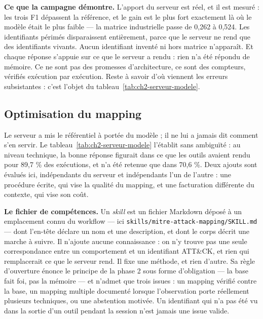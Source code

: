 \textbf{Ce que la campagne démontre.} L'apport du serveur est réel, et il est mesuré : les trois F1 dépassent la référence, et le gain est le plus fort exactement là où le modèle était le plus faible --- la matrice industrielle passe de 0,262 à 0,524. Les identifiants périmés disparaissent entièrement, parce que le serveur ne rend que des identifiants vivants. Aucun identifiant inventé ni hors matrice n'apparaît. Et chaque réponse s'appuie sur ce que le serveur a rendu : rien n'a été répondu de mémoire. Ce ne sont pas des promesses d'architecture, ce sont des compteurs, vérifiés exécution par exécution. Reste à savoir d'où viennent les erreurs subsistantes : c'est l'objet du tableau~\ref{tab:ch2-serveur-modele}.

\subsection{Optimisation du mapping}\label{sec:ch2-3-6}

Le serveur a mis le référentiel à portée du modèle ; il ne lui a jamais dit comment s'en servir. Le tableau~\ref{tab:ch2-serveur-modele} l'établit sans ambiguïté : au niveau technique, la bonne réponse figurait dans ce que les outils avaient rendu pour 89,7 \% des exécutions, et n'a été retenue que dans 70,6 \%. Deux ajouts sont évalués ici, indépendants du serveur et indépendants l'un de l'autre : une procédure écrite, qui vise la qualité du mapping, et une facturation différente du contexte, qui vise son coût.

\textbf{Le fichier de compétences.} Un \emph{skill} est un fichier Markdown déposé à un emplacement connu du workflow --- ici \texttt{skills/mitre-attack-mapping/SKILL.md} --- dont l'en-tête déclare un nom et une description, et dont le corps décrit une marche à suivre. Il n'ajoute aucune connaissance : on n'y trouve pas une seule correspondance entre un comportement et un identifiant ATT\&CK, et rien qui remplacerait ce que le serveur rend. Il fixe une méthode, et rien d'autre. Sa règle d'ouverture énonce le principe de la phase 2 sous forme d'obligation --- la base fait foi, pas la mémoire --- et n'admet que trois issues : un mapping vérifié contre la base, un mapping multiple documenté lorsque l'observation porte réellement plusieurs techniques, ou une abstention motivée. Un identifiant qui n'a pas été vu dans la sortie d'un outil pendant la session n'est jamais une issue valide.

